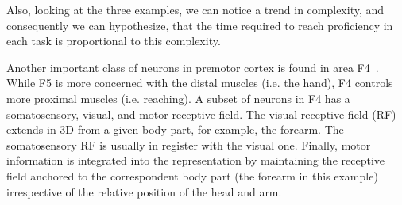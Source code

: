 \ifverbose
Also, looking at the three examples, we can notice 
a trend in complexity, and consequently we can hypothesize, that the time 
required to reach proficiency in each task is proportional to this complexity.
\fi

\ifverbose
Another important class of neurons in premotor cortex is found in area
F4~\cite{fogassi96coding}. While F5 is more concerned with the distal
muscles (i.e. the hand), F4 controls more proximal muscles (i.e.
reaching). A subset of neurons in F4 has a somatosensory, visual, and
motor receptive field. The visual receptive field (RF) extends in 3D
from a given body part, for example, the forearm. The somatosensory RF
is usually in register with the visual one. Finally, motor information
is integrated into the representation by maintaining the receptive
field anchored to the correspondent body part (the forearm in this
example) irrespective of the relative position of the head and arm.
\fi
